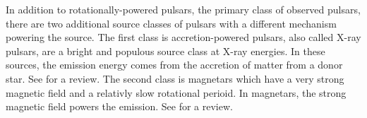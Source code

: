 In addition to rotationally-powered pulsars, the primary class of
observed pulsars, there are two additional source classes of pulsars
with a different mechanism powering the source.  The first class is
accretion-powered pulsars, also called X-ray pulsars, are a bright
and populous source class at X-ray energies. In these sources, the
emission energy comes from the accretion of matter from a donor star. See
\cite{caballero_2012a_x-ray-pulsars:} for a review.  The second class
is magnetars which have a very strong magnetic field and a relativly
slow rotational perioid. In magnetars, the strong magnetic field powers
the emission.  See \cite{rea_2011a_magnetar-outbursts:} for a review.
